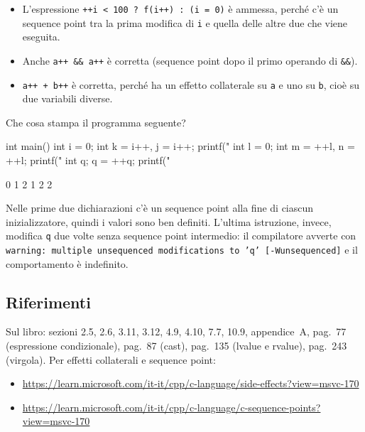 \documentclass[11pt,a4paper]{article}
\begin{document}
\begin{esempio}
\begin{itemize}
    \item L'espressione \lstinline|++i < 100 ? f(i++) : (i = 0)| è ammessa, perché c'è un sequence point tra la prima modifica di \lstinline|i| e quella delle altre due che viene eseguita.
    \item Anche \lstinline|a++ && a++| è corretta (sequence point dopo il primo operando di \lstinline|&&|).
    \item \lstinline|a++ + b++| è corretta, perché ha un effetto collaterale su \lstinline|a| e uno su \lstinline|b|, cioè su due variabili diverse.
\end{itemize}
\end{esempio}

\begin{esercizio}
Che cosa stampa il programma seguente?
\begin{codice}
int main()
{
    int i = 0;
    int k = i++, j = i++;
    printf("%
    int l = 0;
    int m = ++l, n = ++l;
    printf("%
    int q;
    q = ++q;
    printf("%
}
\end{codice}
\begin{risultato}
0 1 2
1 2 2
\end{risultato}
Nelle prime due dichiarazioni c'è un sequence point alla fine di ciascun inizializzatore, quindi i valori sono ben definiti. L'ultima istruzione, invece, modifica \lstinline|q| due volte senza sequence point intermedio: il compilatore avverte con
\texttt{warning: multiple unsequenced modifications to 'q' [-Wunsequenced]} e il comportamento è indefinito.
\end{esercizio}

\subsection{Riferimenti}

Sul libro: sezioni 2.5, 2.6, 3.11, 3.12, 4.9, 4.10, 7.7, 10.9, appendice~A, pag.~77 (espressione condizionale), pag.~87 (cast), pag.~135 (lvalue e rvalue), pag.~243 (virgola). Per effetti collaterali e sequence point:
\begin{itemize}
    \item {\footnotesize\url{https://learn.microsoft.com/it-it/cpp/c-language/side-effects?view=msvc-170}}
    \item {\footnotesize\url{https://learn.microsoft.com/it-it/cpp/c-language/c-sequence-points?view=msvc-170}}
\end{itemize}
\end{document}
